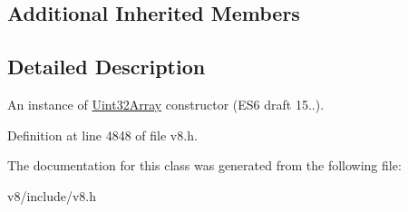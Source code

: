 \subsection*{Additional Inherited Members}


\subsection{Detailed Description}
An instance of \mbox{\hyperlink{classv8_1_1Uint32Array}{Uint32\+Array}} constructor (E\+S6 draft 15..). 

Definition at line 4848 of file v8.\+h.



The documentation for this class was generated from the following file\+:\begin{DoxyCompactItemize}
\item 
v8/include/v8.\+h\end{DoxyCompactItemize}
